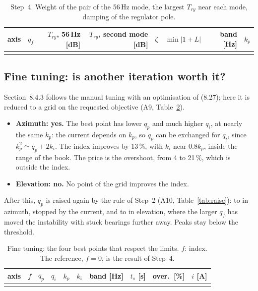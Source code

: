 \documentclass[10pt,a4paper]{article}
\numberwithin{equation}{section}
\begin{document}
\begin{table}[H]\centering\footnotesize
\caption{Step~4. Weight of the pair of the 56\,Hz mode, the largest $T_{ry}$ near each mode, damping of the regulator pole.}\label{tab:s4}
\begin{tabular}{lrrrrrrr}\toprule
axis & $q_f$ & $T_{ry}$, 56\,Hz [dB] & $T_{ry}$, second mode [dB] & $\zeta$ & $\min|1+L|$ & band [Hz] & $k_p$ \\ \midrule
\\ \bottomrule
\end{tabular}\end{table}

\subsection{Fine tuning: is another iteration worth it?}
Section~8.4.3 follows the manual tuning with an optimisation of (8.27); here it is reduced to a grid on the requested objective (A9, Table~\ref{tab:fine}).
\begin{itemize}
\item \textbf{Azimuth: yes.} The best point has lower $q_p$ and much higher $q_i$, at nearly the same $k_p$: the current depends on $k_p$, so $q_p$ can be exchanged for $q_i$, since $k_p^2\simeq q_p+2k_i$. The index improves by 13\,\%, with $k_i$ near $0.8k_p$, inside the range of the book. The price is the overshoot, from 4 to 21\,\%, which is outside the index.
\item \textbf{Elevation: no.} No point of the grid improves the index.
\end{itemize}
After this, $q_p$ is raised again by the rule of Step~2 (A10, Table~\ref{tab:raise}): to \sRaisedA in azimuth, stopped by the current, and to \sRaisedP in elevation, where the larger $q_f$ has moved the instability with stuck bearings further away. Peaks stay below the threshold.

\begin{table}[H]\centering\footnotesize\setlength{\tabcolsep}{4pt}
\caption{Fine tuning: the four best points that respect the limits. $f$: index. The reference, $f=0$, is the result of Step~4.}\label{tab:fine}
\begin{tabular}{lrrrrrrrrr}\toprule
axis & $f$ & $q_p$ & $q_i$ & $k_p$ & $k_i$ & band [Hz] & $t_s$ [s] & over.\ [\%] & $i$ [A] \\ \midrule
\\ \bottomrule
\end{tabular}\end{table}
\end{document}
